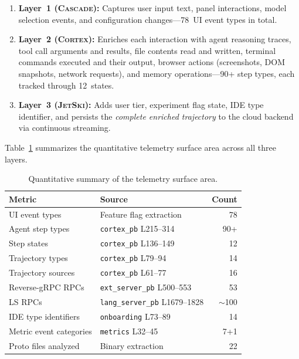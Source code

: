 \documentclass[sigconf,anonymous]{acmart}
\newcommand{\cascade}{\textsc{Cascade}\xspace}
\newcommand{\cortex}{\textsc{Cortex}\xspace}
\newcommand{\jetski}{\textsc{JetSki}\xspace}
\begin{document}
\begin{enumerate}[nosep]
  \item \textbf{Layer~1 (\cascade):} Captures user input text, panel
    interactions, model selection events, and configuration
    changes---78~UI event types in total.
  \item \textbf{Layer~2 (\cortex):} Enriches each interaction with
    agent reasoning traces, tool call arguments and results, file
    contents read and written, terminal commands executed and their
    output, browser actions (screenshots, DOM snapshots, network
    requests), and memory operations---90+ step types, each tracked
    through 12~states.
  \item \textbf{Layer~3 (\jetski):} Adds user tier, experiment flag
    state, IDE type identifier, and persists the \emph{complete
    enriched trajectory} to the cloud backend via continuous streaming.
\end{enumerate}

\noindent Table~\ref{tab:summary} summarizes the quantitative
telemetry surface area across all three layers.

\begin{table}[t]
\centering
\caption{Quantitative summary of the telemetry surface area.}
\label{tab:summary}
\small
\begin{tabular}{@{}llr@{}}
\toprule
\textbf{Metric} & \textbf{Source} & \textbf{Count} \\
\midrule
UI event types          & Feature flag extraction        & 78 \\
Agent step types        & \texttt{cortex\_pb} L215--314  & 90+ \\
Step states             & \texttt{cortex\_pb} L136--149  & 12 \\
Trajectory types        & \texttt{cortex\_pb} L79--94    & 14 \\
Trajectory sources      & \texttt{cortex\_pb} L61--77    & 16 \\
Reverse-gRPC RPCs       & \texttt{ext\_server\_pb} L500--553  & 53 \\
LS RPCs                 & \texttt{lang\_server\_pb} L1679--1828 & $\sim$100 \\
IDE type identifiers    & \texttt{onboarding} L73--89    & 14 \\
Metric event categories & \texttt{metrics} L32--45       & 7+1 \\
Proto files analyzed    & Binary extraction              & 22 \\
\bottomrule
\end{tabular}
\end{table}
\end{document}
